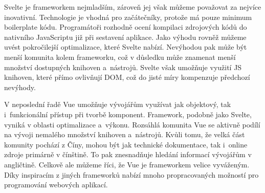 Svelte je frameworkem nejmladším, zároveň jej však můžeme považovat za nejvíce inovativní. 
Technologie je vhodná pro začátečníky, protože má pouze minimum boilerplate kódu. 
Programátoři rozhodně ocení kompilaci zdrojových kódů do nativního JavaScriptu již při sestavení aplikace. 
Jako výhodu rovněž můžeme uvést pokročilejší optimalizace, které Svelte nabízí. 
Nevýhodou pak může být menší komunita kolem frameworku, což v důsledku může znamenat menší množství dostupných knihoven a~nástrojů. 
Svelte však umožňuje využití JS knihoven, které přímo ovlivňují DOM, což do jisté míry kompenzuje předchozí nevýhody.

V neposlední řadě Vue umožňuje vývojářům využívat jak objektový, tak i~funkcionální přístup při tvorbě komponent. 
Framework, podobně jako Svelte, vyniká v oblasti optimalizace a~výkonu. Rozsáhlá komunita Vue se aktivně podílí na vývoji nemalého množství knihoven a~nástrojů. 
Kvůli tomu, že velká část komunity pochází z Číny, mohou být jak technické dokumentace, tak i~online zdroje primárně v čínštině. 
To pak znesnadňuje hledání informací vývojářům v angličtině. Celkově ale můžeme říci, že Vue je frameworkem velice vyváženým. 
Díky inspiracím z jiných frameworků nabízí mnoho propracovaných možností pro programování webových aplikací.